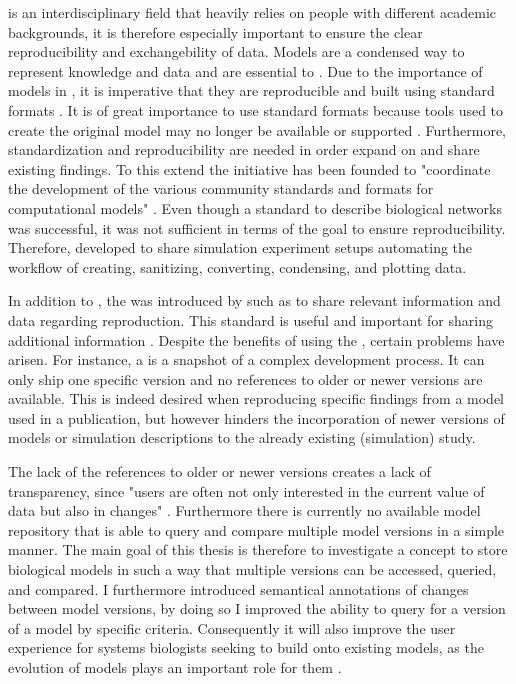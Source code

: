 \sysbio is an interdisciplinary field that heavily relies on people with different academic backgrounds, it is therefore especially important to ensure the clear reproducibility and exchangebility of data.
Models are a condensed way to represent knowledge and data and are essential to \sysbio.
Due to the importance of models in \sysbio, it is imperative that they are reproducible and built using standard formats \citep{Drager2014}.
It is of great importance to use standard formats because tools used to create the original model may no longer be available or supported \citep{Peng2011}.
Furthermore, standardization and reproducibility are needed in order expand on and share existing findings.
To this extend the \combine initiative has been founded to "coordinate the development of the various community standards and formats for computational models" \citep{COMBINE}.
Even though a standard to describe biological networks was successful, it was not sufficient in terms of the goal to ensure reproducibility. Therefore, \citeauthor{Waltemath2011a} developed \sedml \citep{Waltemath2011a} to share simulation experiment setups automating the workflow of creating, sanitizing, converting, condensing, and plotting data.

In addition to \sedml, the \ca was introduced by \citet{Bergmann2014a} such as to share relevant information and data regarding reproduction. This standard is useful and important for sharing additional information \citep{Bergmann2014a}. %
Despite the benefits of using the \ca, certain problems have arisen. For instance, a \ca is a snapshot of a complex development process. It can only ship one specific version and no references to older or newer versions are available. This is indeed desired when reproducing specific findings from a model used in a publication, but however hinders the incorporation of newer versions of models or simulation descriptions to the already existing (simulation) study.

The lack of the references to older or newer versions creates a lack of transparency, since "users are often not only interested in the current value of data but also in changes" \citep{Cobena2002}. Furthermore there is currently no available model repository that is able to query and compare multiple model versions in a simple manner.
The main goal of this thesis is therefore to investigate a concept to store biological models in such a way that multiple versions can be accessed, queried, and compared. I furthermore introduced semantical annotations of changes between model versions, by doing so I improved the ability to query for a version of a model by specific criteria. Consequently it will also improve the user experience for systems biologists seeking to build onto existing models, as the evolution of models plays an important role for them \citep{Scharm2015}.

